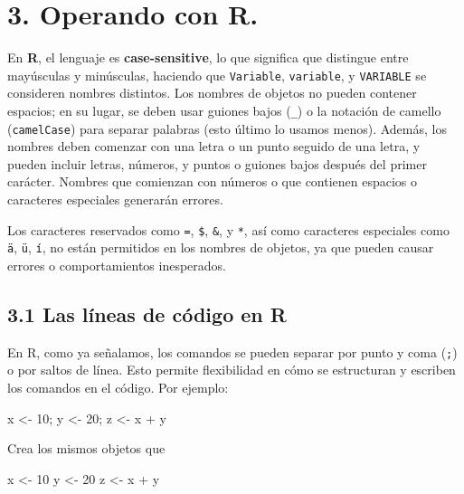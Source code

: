 \documentclass[
  letterpaper,
  DIV=11,
  numbers=noendperiod]{scrreprt}
\newenvironment{Shaded}{\begin{snugshade}}{\end{snugshade}}
\newcommand{\DecValTok}[1]{\textcolor[rgb]{0.68,0.00,0.00}{#1}}
\newcommand{\NormalTok}[1]{\textcolor[rgb]{0.00,0.23,0.31}{#1}}
\newcommand{\OtherTok}[1]{\textcolor[rgb]{0.00,0.23,0.31}{#1}}
\newcommand{\SpecialCharTok}[1]{\textcolor[rgb]{0.37,0.37,0.37}{#1}}
\begin{document}
\hypertarget{operando-con-r.}{%
\section{3. Operando con R.}\label{operando-con-r.}}

En \textbf{R}, el lenguaje es \textbf{case-sensitive}, lo que significa
que distingue entre mayúsculas y minúsculas, haciendo que
\texttt{Variable}, \texttt{variable}, y \texttt{VARIABLE} se consideren
nombres distintos. Los nombres de objetos no pueden contener espacios;
en su lugar, se deben usar guiones bajos (\texttt{\_}) o la notación de
camello (\texttt{camelCase}) para separar palabras (esto último lo
usamos menos). Además, los nombres deben comenzar con una letra o un
punto seguido de una letra, y pueden incluir letras, números, y puntos o
guiones bajos después del primer carácter. Nombres que comienzan con
números o que contienen espacios o caracteres especiales generarán
errores.

Los caracteres reservados como \texttt{=}, \texttt{\$}, \texttt{\&}, y
\texttt{*}, así como caracteres especiales como \texttt{ä}, \texttt{ü},
\texttt{í}, no están permitidos en los nombres de objetos, ya que pueden
causar errores o comportamientos inesperados.

\hypertarget{las-luxedneas-de-cuxf3digo-en-r}{%
\subsection{3.1 Las líneas de código en
R}\label{las-luxedneas-de-cuxf3digo-en-r}}

En R, como ya señalamos, los comandos se pueden separar por punto y coma
(\texttt{;}) o por saltos de línea. Esto permite flexibilidad en cómo se
estructuran y escriben los comandos en el código. Por ejemplo:

\begin{Shaded}
\begin{Highlighting}[]
\NormalTok{x }\OtherTok{\textless{}{-}} \DecValTok{10}\NormalTok{; y }\OtherTok{\textless{}{-}} \DecValTok{20}\NormalTok{; z }\OtherTok{\textless{}{-}}\NormalTok{ x }\SpecialCharTok{+}\NormalTok{ y}
\end{Highlighting}
\end{Shaded}

Crea los mismos objetos que

\begin{Shaded}
\begin{Highlighting}[]
\NormalTok{x }\OtherTok{\textless{}{-}} \DecValTok{10}
\NormalTok{y }\OtherTok{\textless{}{-}} \DecValTok{20}
\NormalTok{z }\OtherTok{\textless{}{-}}\NormalTok{ x }\SpecialCharTok{+}\NormalTok{ y}
\end{Highlighting}
\end{Shaded}
\end{document}
